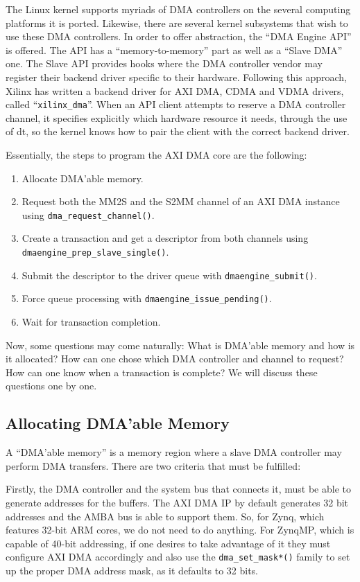 The Linux kernel supports myriads of DMA controllers on the several computing platforms it is ported.
Likewise, there are several kernel subsystems that wish to use these DMA controllers.
In order to offer abstraction, the ``DMA Engine API'' is offered. The API has a
``memory-to-memory'' part as well as a ``Slave DMA'' one.
The Slave API provides hooks where the DMA controller vendor may register their backend driver 
specific to their hardware. Following this approach, Xilinx
has written a backend driver for AXI DMA, CDMA and VDMA drivers, called ``\texttt{xilinx\_dma}''.
When an API client attempts to reserve a DMA controller channel, it specifies explicitly
which hardware resource it needs, through the use of \gls{dt}, 
so the kernel knows how to pair the client with the correct backend driver.

Essentially, the steps to program the AXI DMA core are the following:

\begin{enumerate}
\item	Allocate DMA'able memory.
\item	Request both the MM2S and the S2MM channel of an AXI DMA instance using \texttt{dma\_request\_channel()}.
\item	Create a transaction and get a descriptor from both channels using \texttt{dmaengine\_prep\_slave\_single()}.
\item	Submit the descriptor to the driver queue with \texttt{dmaengine\_submit()}.
\item	Force queue processing with \texttt{dmaengine\_issue\_pending()}.
\item	Wait for transaction completion.
\end{enumerate}

Now, some questions may come naturally: What is DMA'able memory and how is it allocated? 
How can one chose which DMA controller and channel to request?
How can one know when a transaction is complete?
We will discuss these questions one by one.

\subsection{Allocating DMA'able Memory}
\label{sec:allocating-memory}

A ``DMA'able memory'' is a memory region where a slave DMA controller may perform DMA transfers.
There are two criteria that must be fulfilled:

Firstly, the DMA controller and the system bus that connects it, must be able to generate
addresses for the buffers. The AXI DMA IP by default generates 32 bit addresses and the AMBA bus
is able to support them. So, for Zynq, which features 32-bit ARM cores, we do not need to do anything.
For ZynqMP, which is capable of 40-bit addressing, if one desires to take advantage of it they must
configure AXI DMA accordingly and also use the \texttt{dma\_set\_mask*()} family to set up the proper
DMA address mask, as it defaults to 32 bits.

